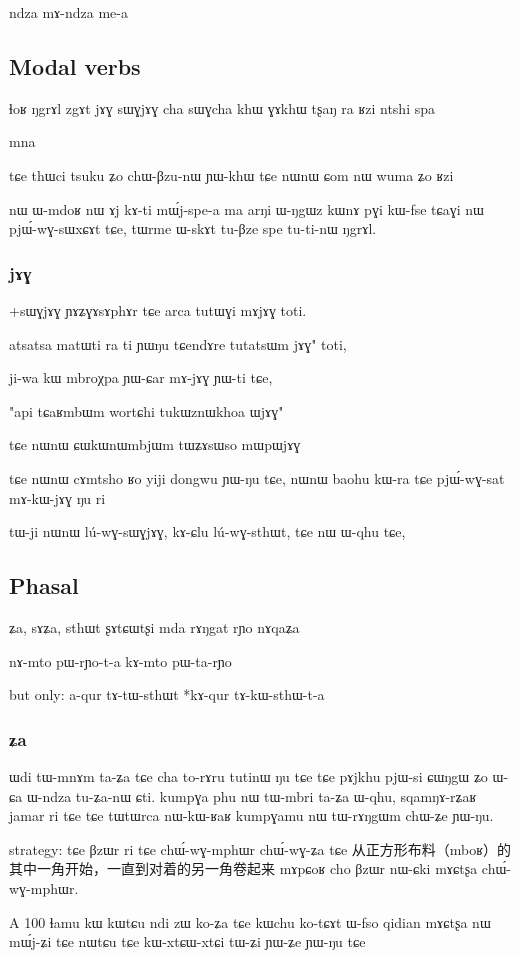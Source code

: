 \documentclass[oldfontcommands,oneside,a4paper,11pt]{article}
\begin{document}
  ndza mɤ-ndza me-a
  
  
  \subsection{Modal verbs}
 ɬoʁ
ŋgrɤl
zgɤt
jɤɣ sɯɣjɤɣ
cha sɯɣcha
khɯ ɣɤkhɯ
tʂaŋ
ra
ʁzi
ntshi
spa

 
mna

tɕe thɯci tsuku ʑo chɯ-βzu-nɯ ɲɯ-khɯ
tɕe nɯnɯ ɕom nɯ wuma ʑo ʁzi

nɯ ɯ-mdoʁ nɯ ɤj kɤ-ti mɯ́j-spe-a ma arŋi ɯ-ŋgɯz kɯnɤ pɣi kɯ-fse
tɕaɣi nɯ pjɯ́-wɣ-sɯxɕɤt tɕe, tɯrme ɯ-skɤt tu-βze spe tu-ti-nɯ ŋgrɤl.


 \subsubsection{jɤɣ}
 +sɯɣjɤɣ
 ɲɤʑɣɤsɤphɤr tɕe arca tutɯɣi mɤjɤɣ toti.

atsatsa matɯti ra ti ɲɯŋu
tɕendɤre tutatsɯm jɤɣ" toti,

ji-wa kɯ mbroχpa ɲɯ-ɕar mɤ-jɤɣ ɲɯ-ti tɕe,

"api tɕaʁmbɯm wortɕhi tukɯznɯkhoa ɯjɤɣ"

tɕe nɯnɯ ɕɯkɯnɯmbjɯm tɯʑɤsɯso mɯpɯjɤɣ

tɕe nɯnɯ cɤmtsho ʁo yiji dongwu ɲɯ-ŋu tɕe, nɯnɯ
baohu kɯ-ra tɕe pjɯ́-wɣ-sat mɤ-kɯ-jɤɣ ŋu ri
 
tɯ-ji nɯnɯ lú-wɣ-sɯɣjɤɣ, kɤ-ɕlu lú-wɣ-sthɯt, tɕe nɯ ɯ-qhu tɕe,
\subsection{Phasal}
ʑa, sɤʑa, sthɯt ʂɤtɕɯtʂi mda rɤŋgat rɲo
nɤqaʑa

nɤ-mto pɯ-rɲo-t-a
kɤ-mto pɯ-ta-rɲo

but only: a-qur tɤ-tɯ-sthɯt *kɤ-qur tɤ-kɯ-sthɯ-t-a
\subsubsection{ʑa}
 ɯdi tɯ-mnɤm ta-ʑa tɕe cha to-rɤru tutinɯ ŋu tɕe
tɕe pɤjkhu pjɯ-si ɕɯŋgɯ ʑo ɯ-ɕa ɯ-ndza tu-ʑa-nɯ ɕti.
kumpɣa phu nɯ tɯ-mbri ta-ʑa ɯ-qhu, 
sqamŋɤ-rʑaʁ jamar ri tɕe tɕe tɯtɯrca nɯ-kɯ-ʁaʁ kumpɣamu nɯ tɯ-rɤŋgɯm chɯ-ʑe ɲɯ-ŋu.

strategy:
tɕe βzɯr ri tɕe chɯ́-wɣ-mphɯr chɯ́-wɣ-ʑa tɕe 从正方形布料（mboʁ）的其中一角开始，一直到对着的另一角卷起来
mɤpɕoʁ cho βzɯr nɯ-ɕki mɤɕtʂa chɯ́-wɣ-mphɯr.

A	100	ɬamu	kɯ	kɯtɕu	ndi	zɯ	ko-ʑa	tɕe	kɯchu	ko-tɕɤt
ɯ-fso qidian mɤɕtʂa nɯ mɯ́j-ʑi
tɕe nɯtɕu tɕe kɯ-xtɕɯ-xtɕi tɯ-ʑi ɲɯ-ʑe ɲɯ-ŋu tɕe
\end{document}

